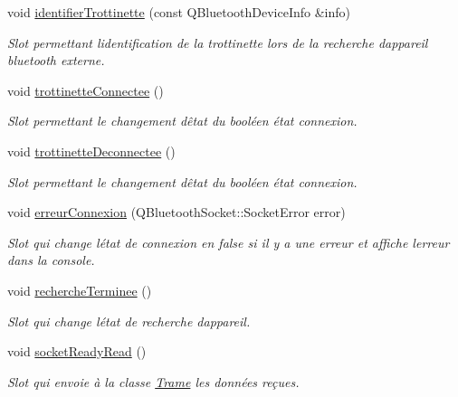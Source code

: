 \begin{DoxyCompactItemize}
\item 
void \hyperlink{class_peripherique_local_aab3b5a9b584b0191b9f690add1cfa6ed}{identifier\+Trottinette} (const Q\+Bluetooth\+Device\+Info \&info)
\begin{DoxyCompactList}\small\item\em Slot permettant l\textquotesingle{}identification de la trottinette lors de la recherche d\textquotesingle{}appareil bluetooth externe. \end{DoxyCompactList}\item 
void \hyperlink{class_peripherique_local_ad6e76380e6c9f48c36a10ac4af2c3d96}{trottinette\+Connectee} ()
\begin{DoxyCompactList}\small\item\em Slot permettant le changement d\textquotesingle{}êtat du booléen état connexion. \end{DoxyCompactList}\item 
void \hyperlink{class_peripherique_local_ab081485bf0f9403d9e7fc5f0407cdc5c}{trottinette\+Deconnectee} ()
\begin{DoxyCompactList}\small\item\em Slot permettant le changement d\textquotesingle{}êtat du booléen état connexion. \end{DoxyCompactList}\item 
void \hyperlink{class_peripherique_local_abb86db4a2a3d72a5de32253aa9af1ce8}{erreur\+Connexion} (Q\+Bluetooth\+Socket\+::\+Socket\+Error error)
\begin{DoxyCompactList}\small\item\em Slot qui change l\textquotesingle{}état de connexion en false si il y a une erreur et affiche l\textquotesingle{}erreur dans la console. \end{DoxyCompactList}\item 
void \hyperlink{class_peripherique_local_a16add86080e72a5ce804ff9296e10415}{recherche\+Terminee} ()
\begin{DoxyCompactList}\small\item\em Slot qui change l\textquotesingle{}état de recherche d\textquotesingle{}appareil. \end{DoxyCompactList}\item 
void \hyperlink{class_peripherique_local_a48840475209b5cabcf60e3176de63b92}{socket\+Ready\+Read} ()
\begin{DoxyCompactList}\small\item\em Slot qui envoie à la classe \hyperlink{class_trame}{Trame} les données reçues. \end{DoxyCompactList}\item 

\end{DoxyCompactItemize}
